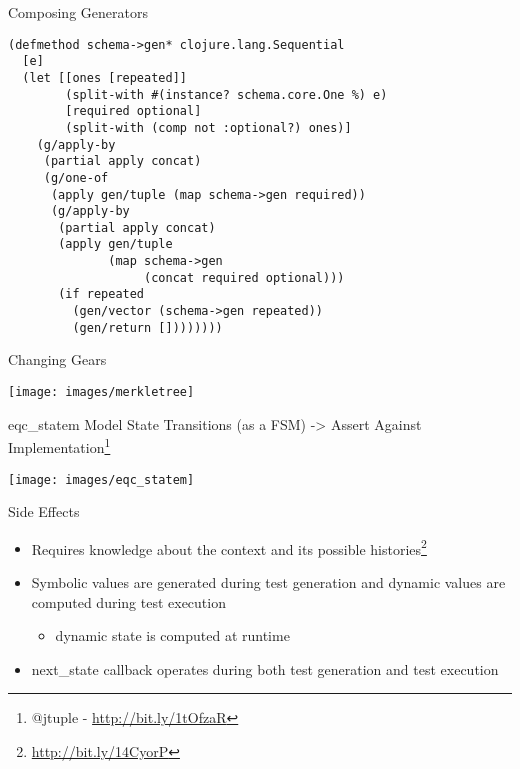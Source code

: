 \documentclass[presentation, bigger]{beamer}
\begin{document}
\begin{frame}[fragile,shrink,label=sec-]{}
 \alert{Composing Generators}

\begin{verbatim}
(defmethod schema->gen* clojure.lang.Sequential
  [e]
  (let [[ones [repeated]]
        (split-with #(instance? schema.core.One %) e)
        [required optional]
        (split-with (comp not :optional?) ones)]
    (g/apply-by
     (partial apply concat)
     (g/one-of
      (apply gen/tuple (map schema->gen required))
      (g/apply-by
       (partial apply concat)
       (apply gen/tuple
              (map schema->gen
                   (concat required optional)))
       (if repeated
         (gen/vector (schema->gen repeated))
         (gen/return [])))))))
\end{verbatim}
\end{frame}
\begin{frame}[label=sec-]{Changing Gears}
\begin{center}
 \texttt{[image: images/merkletree]}
\end{center}
\end{frame}
\begin{frame}[label=sec-]{eqc\_statem}
Model State Transitions (as a FSM) -> Assert Against Implementation\footnote{@jtuple - \url{http://bit.ly/1tOfzaR}}

\begin{center}
 \texttt{[image: images/eqc\_statem]}
\end{center}
\end{frame}
\begin{frame}[label=sec-]{Side Effects}
\begin{itemize}
\item Requires knowledge about the \alert{context} and its possible
\alert{histories}\footnote{\url{http://bit.ly/14CyorP}}
\item \alert{Symbolic values} are generated during test \alert{generation}
    and \alert{dynamic values} are computed during test \alert{execution}
\begin{itemize}
\item dynamic state is computed at runtime
\end{itemize}
\item \alert{next\_state} callback operates during both test \alert{generation}
     and test \alert{execution}
\end{itemize}
\end{frame}
\end{document}
